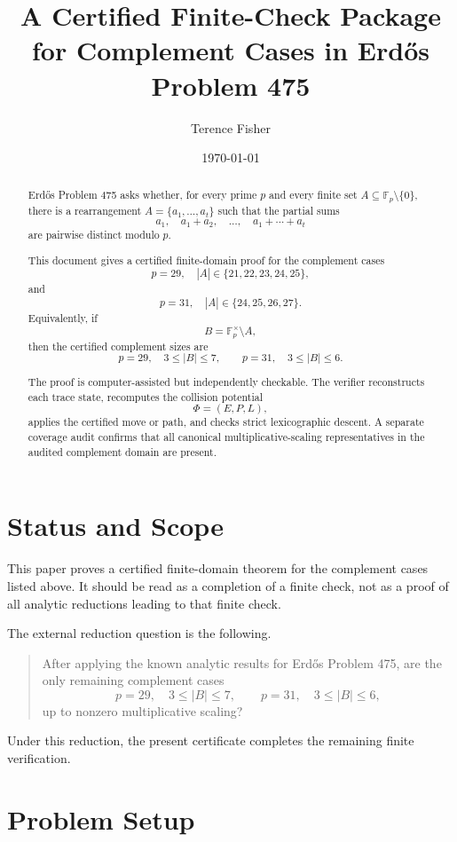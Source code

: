 \documentclass[11pt]{article}
\title{A Certified Finite-Check Package for Complement Cases in Erd\H{o}s Problem 475}
\author{Terence Fisher}
\date{\today}
\begin{document}
\maketitle

\begin{abstract}
Erd\H{o}s Problem 475 asks whether, for every prime \(p\) and every finite set
\(A\subseteq \mathbb F_p\setminus\{0\}\), there is a rearrangement
\(A=\{a_1,\ldots,a_t\}\) such that the partial sums
\[
a_1,\quad a_1+a_2,\quad \ldots,\quad a_1+\cdots+a_t
\]
are pairwise distinct modulo \(p\).

This document gives a certified finite-domain proof for the complement cases
\[
p=29,\quad |A|\in\{21,22,23,24,25\},
\]
and
\[
p=31,\quad |A|\in\{24,25,26,27\}.
\]
Equivalently, if
\[
B=\mathbb F_p^\times\setminus A,
\]
then the certified complement sizes are
\[
p=29,\quad 3\le |B|\le 7,
\qquad
p=31,\quad 3\le |B|\le 6.
\]

The proof is computer-assisted but independently checkable. The verifier reconstructs each trace state, recomputes the collision potential
\[
\Phi=(E,P,L),
\]
applies the certified move or path, and checks strict lexicographic descent. A separate coverage audit confirms that all canonical multiplicative-scaling representatives in the audited complement domain are present.
\end{abstract}

\section{Status and Scope}

This paper proves a certified finite-domain theorem for the complement cases listed above. It should be read as a completion of a finite check, not as a proof of all analytic reductions leading to that finite check.

The external reduction question is the following.

\begin{quote}
After applying the known analytic results for Erd\H{o}s Problem 475, are the only remaining complement cases
\[
p=29,\quad 3\le |B|\le7,
\qquad
p=31,\quad 3\le |B|\le6,
\]
up to nonzero multiplicative scaling?
\end{quote}

Under this reduction, the present certificate completes the remaining finite verification.

\section{Problem Setup}
\end{document}
